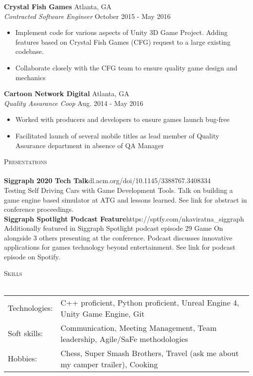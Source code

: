 \documentclass[a4paper]{article}
\newcommand{\lineunder} {
    \vspace*{-8pt} \\
    \hspace*{-18pt} \hrulefill \\
}
\newcommand{\header} [1] {
    {\hspace*{-18pt}\vspace*{6pt} \textsc{#1}}
    \vspace*{-6pt} \lineunder
}
\begin{document}
\textbf{Crystal Fish Games} \hfill Atlanta, GA\\
\textit{Contracted Software Engineer} \hfill October 2015 - May 2016\\
\vspace{-1mm}
\begin{itemize} \itemsep 1pt
	\item Implement code for various aspects of Unity 3D Game Project. Adding features based on Crystal Fish Games (CFG) request to a large existing codebase.
	\item Collaborate closely with the CFG team to ensure quality game design and mechanics
\end{itemize}
\textbf{Cartoon Network Digital} \hfill Atlanta, GA\\
\textit{Quality Assurance Coop} \hfill Aug. 2014 - May 2016\\
\vspace{-1mm}
\begin{itemize} \itemsep 1pt
	\item Worked with producers and developers to ensure games launch bug-free
	\item Facilitated launch of several mobile titles as lead member of Quality Assurance department in absence of QA Manager
\end{itemize}

\header{Presentations}
{\textbf{Siggraph 2020 Tech Talk}}\hfill dl.acm.org/doi/10.1145/3388767.3408334\\
\textquotedbl{}Testing Self Driving Cars with Game Development Tools\textquotedbl{}. Talk on building a game engine based simulator at ATG and lessons learned. See link for abstract in conference proceedings.\\
\vspace*{2mm}
{\textbf{Siggraph Spotlight Podcast Feature}}\hfill https://sptfy.com/nkaviratna\_siggraph\\
Additionally featured in Siggraph Spotlight podcast episode 29 \textquotedbl{}Game On\textquotedbl{} alongside 3 others presenting at the conference. Podcast discusses innovative applications for games technology beyond entertainment. See link for podcast episode on Spotify.\\
\vspace*{2mm}

\header{Skills}
\begin{tabular}{ l l }
	Technologies: & C++ proficient, Python proficient, Unreal Engine 4, Unity Game Engine, Git    \\
	Soft skills:  & Communication, Meeting Management, Team leadership, Agile/SaFe methodologies  \\
	Hobbies:      & Chess, Super Smash Brothers, Travel (ask me about my camper trailer), Cooking \\
\end{tabular}
\vspace{2mm}
\end{document}
